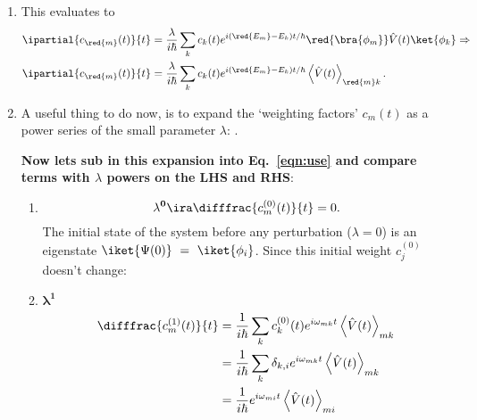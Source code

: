 \begin{enumerate}
	\item This evaluates to 
	\begin{equation}\label{eqn:use}
		\begin{aligned}
			\ipartial{c_{\red{m}}(t)}{t} & = \frac{\lambda}{i\hbar} \sum_k c_k(t)e^{i(\red{E_m}-E_k)t/\hbar} \red{\bra{\phi_m}}\hat{V}(t)\ket{\phi_k}\Rightarrow\\
			\ipartial{c_{\red{m}}(t)}{t} & = \frac{\lambda}{i\hbar} \sum_k c_k(t)e^{i(\red{E_m}-E_k)t/\hbar} \left\langle\hat{V}(t)\right\rangle_{\red{m}k}.
			\end{aligned}
	\end{equation}
	\item A useful thing to do now, is to expand the `weighting factors' $ c_m(t) $ as a power series of the small parameter $ \lambda $:
	.
	\vspace{-1em}
	
	\textbf{\noindent Now lets sub in this expansion into Eq.~\ref{eqn:use} and compare terms with $ \lambda $ powers on the LHS and RHS}:
	\begin{enumerate}
		\item 
		\begin{equation}
			\mathbf{\lambda^{0}} \ira \difffrac{c^{(0)}_m(t)}{t} = 0.
		\end{equation}
		\noindent The initial state of the system before any perturbation ($ \lambda = 0 $) is an eigenstate $ \iket{\Psi(0)}~=~\iket{\phi_i} $. Since this initial weight $ c_j^{(0)} $ doesn't change:
		
		\item $ \mathbf{\lambda^{1}} $
		\begin{equation}\label{lam1}
		\begin{aligned}
		\difffrac{c^{(1)}_m(t)}{t} & = \frac{1}{i\hbar}\sum_{k}c_{k}^{(0)}(t)e^{i\omega_{mk}t} \left\langle\hat{V}(t)\right\rangle_{mk}\\
		& = \frac{1}{i\hbar}\sum_{k}\delta_{k,i}e^{i\omega_{mk}t} \left\langle\hat{V}(t)\right\rangle_{mk}\\
		& = \frac{1}{i\hbar}e^{i\omega_{mi}t} \left\langle\hat{V}(t)\right\rangle_{mi}\\
		\end{aligned}
		\end{equation}
		

\end{enumerate}
\end{enumerate}
